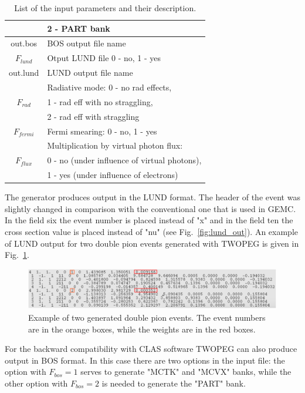 \begin{table}[h]
\begin{center}
\begin{tabular}{|c|l|}
 &  2 - PART bank\\
\hline
out.bos     & BOS output file name\\
\hline
$F_{lund}$  & Otput LUND file 0 - no, 1 - yes\\
\hline
out.lund    & LUND output file name\\
\hline
 & Radiative mode: 0 - no rad effects,\\
$F_{rad}$   & 1 - rad eff with no straggling, \\ 
 & 2 - rad eff with straggling\\
\hline
$F_{fermi}$  & Fermi smearing: 0 - no, 1 - yes\\
\hline
 &Multiplication by virtual photon flux:\\
$F_{flux}$   &0 - no (under influence of virtual photons),\\
&1 - yes (under influence of electrons)\\
\hline
\end{tabular}
\caption{\small List of the input parameters and their description. \label{tab:input_par}}
\end{center}
\end{table}



The generator produces output in the LUND format. The header of the event was slightly changed in comparison with the conventional one that is used in GEMC. In the field six the event number is placed instead of "x" and in the field ten the cross section value is placed instead of "nu"  (see Fig.~\ref{fig:lund_out}). An example of LUND output for two double pion events generated with TWOPEG is given in Fig.~\ref{fig:evnt_exmpl}.

\begin{figure}[!ht]
\begin{center}
\includegraphics[width=1.\textwidth]{pictures/inpparam/events_exmpl.pdf}
\end{center}
\caption{\small Example of two generated double pion events. The event numbers are in the orange boxes, while the weights are in the red boxes.}
\label{fig:evnt_exmpl}
\end{figure}

For the backward compatibility with CLAS software TWOPEG can also produce  output in BOS format. In this case there are two options in the input file: the option with $F_{bos}=1$ serves to generate "MCTK" and "MCVX" banks, while the other option with $F_{bos}=2$ is needed to generate the "PART" bank.




